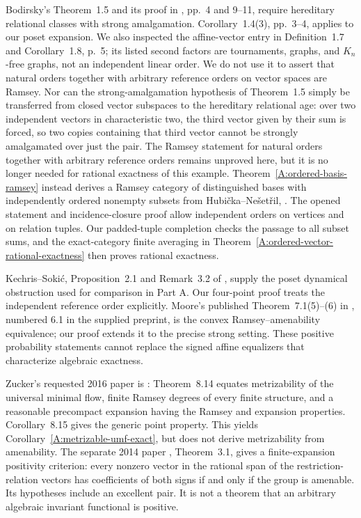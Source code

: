 Bodirsky's Theorem~1.5 and its proof in
\cite{ABBodirsky2014}, pp.~4 and 9--11, require hereditary
relational classes with strong amalgamation. Corollary~1.4(3),
pp.~3--4, applies to our poset expansion. We also inspected the
affine-vector entry in Definition~1.7 and Corollary~1.8, p.~5;
its listed second factors are tournaments, graphs, and
$K_n$-free graphs, not an independent linear order. We do not
use it to assert that natural orders together with arbitrary
reference orders on vector spaces are Ramsey. Nor can the
strong-amalgamation hypothesis of Theorem~1.5 simply be
transferred from closed vector subspaces to the hereditary
relational age: over two independent vectors in characteristic
two, the third vector given by their sum is forced, so two
copies containing that third vector cannot be strongly
amalgamated over just the pair. The Ramsey statement for natural
orders together with arbitrary reference orders remains unproved
here, but it is no longer needed for rational exactness of this
example. Theorem~\ref{A:ordered-basis-ramsey} instead derives a
Ramsey category of distinguished bases with independently ordered
nonempty subsets from Hubi\v cka--Ne\v set\v ril,
\cite[Theorem~4.46, arXiv v4, pp.~75--76]{DHubickaNesetril2019}.
The opened statement and incidence-closure proof allow independent
orders on vertices and on relation tuples. Our padded-tuple completion
checks the passage to all subset sums, and the exact-category
finite averaging in Theorem~\ref{A:ordered-vector-rational-exactness}
then proves rational exactness.

Kechris--Soki\'c, Proposition~2.1 and Remark~3.2 of
\cite{ABKechrisSokic2012}, supply the poset dynamical obstruction
used for comparison in Part A. Our four-point proof treats the
independent reference order explicitly. Moore's published
Theorem~7.1(5)--(6) in \cite{ABMoore2013}, numbered 6.1 in the
supplied preprint, is the convex Ramsey--amenability equivalence;
our proof extends it to the precise strong setting. These positive
probability statements cannot replace the signed affine equalizers
that characterize algebraic exactness.

Zucker's requested 2016 paper is \cite{ABZucker2016}:
Theorem~8.14 equates metrizability of the universal minimal flow,
finite Ramsey degrees of every finite structure, and a reasonable
precompact expansion having the Ramsey and expansion properties.
Corollary~8.15 gives the generic point property. This yields
Corollary~\ref{A:metrizable-umf-exact}, but does not derive
metrizability from amenability. The separate 2014 paper
\cite{ABZucker2014}, Theorem~3.1, gives a finite-expansion positivity
criterion: every nonzero vector in the rational span of the
restriction-relation vectors has coefficients of both signs if
and only if the group is amenable. Its hypotheses include an
excellent pair. It is not a theorem that an arbitrary algebraic
invariant functional is positive.


